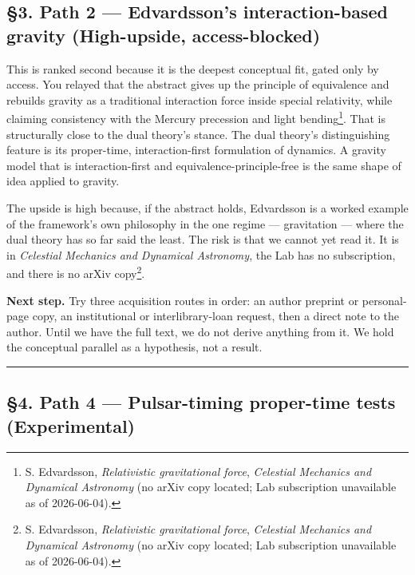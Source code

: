 \documentclass[
  11pt,
]{article}
\begin{document}
\hypertarget{path-2-edvardssons-interaction-based-gravity-high-upside-access-blocked}{%
\subsection{§3. Path 2 --- Edvardsson's interaction-based gravity
(High-upside,
access-blocked)}\label{path-2-edvardssons-interaction-based-gravity-high-upside-access-blocked}}

This is ranked second because it is the deepest conceptual fit, gated
only by access. You relayed that the abstract gives up the principle of
equivalence and rebuilds gravity as a traditional interaction force
inside special relativity, while claiming consistency with the Mercury
precession and light bending\footnote{S. Edvardsson, \emph{Relativistic
  gravitational force}, \emph{Celestial Mechanics and Dynamical
  Astronomy} (no arXiv copy located; Lab subscription unavailable as of
  2026-06-04).}. That is structurally close to the dual theory's stance.
The dual theory's distinguishing feature is its proper-time,
interaction-first formulation of dynamics. A gravity model that is
interaction-first and equivalence-principle-free is the same shape of
idea applied to gravity.

The upside is high because, if the abstract holds, Edvardsson is a
worked example of the framework's own philosophy in the one regime ---
gravitation --- where the dual theory has so far said the least. The
risk is that we cannot yet read it. It is in \emph{Celestial Mechanics
and Dynamical Astronomy}, the Lab has no subscription, and there is no
arXiv copy\footnote{S. Edvardsson, \emph{Relativistic gravitational
  force}, \emph{Celestial Mechanics and Dynamical Astronomy} (no arXiv
  copy located; Lab subscription unavailable as of 2026-06-04).}.

\textbf{Next step.} Try three acquisition routes in order: an author
preprint or personal-page copy, an institutional or interlibrary-loan
request, then a direct note to the author. Until we have the full text,
we do not derive anything from it. We hold the conceptual parallel as a
hypothesis, not a result.

\begin{center}\rule{0.5\linewidth}{0.5pt}\end{center}

\hypertarget{path-4-pulsar-timing-proper-time-tests-experimental}{%
\subsection{§4. Path 4 --- Pulsar-timing proper-time tests
(Experimental)}\label{path-4-pulsar-timing-proper-time-tests-experimental}}
\end{document}
